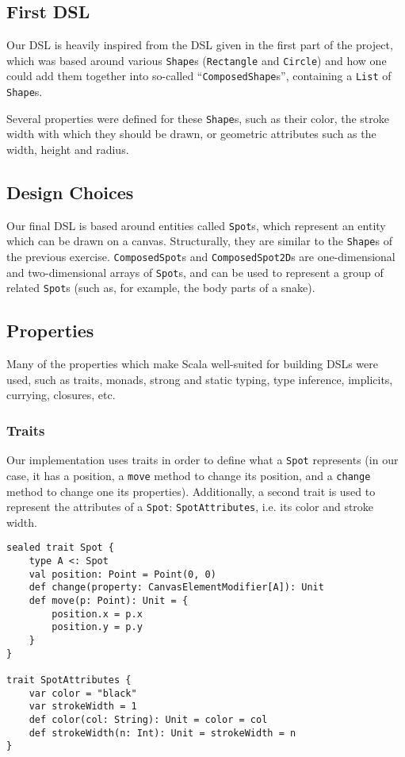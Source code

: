 \documentclass[journal,onecolumn]{IEEEtran}
\theoremstyle{definition}
\newcommand{\scala}[1]{\texttt{#1}}
\begin{document}
\subsection{First DSL}
Our DSL is heavily inspired from the DSL given in the first part of the project, which was based around various \scala{Shape}s (\scala{Rectangle} and \scala{Circle}) and how one could add them together into so-called ``\scala{ComposedShape}s'', containing a \scala{List} of \scala{Shape}s.

Several properties were defined for these \scala{Shape}s, such as their color, the stroke width with which they should be drawn, or geometric attributes such as the width, height and radius.

\subsection{Design Choices}
Our final DSL is based around entities called \scala{Spot}s, which represent an entity which can be drawn on a canvas.
Structurally, they are similar to the \scala{Shape}s of the previous exercise.
\scala{ComposedSpot}s and \scala{ComposedSpot2D}s are one-dimensional and two-dimensional arrays of \scala{Spot}s, and can be used to represent a group of related \scala{Spot}s (such as, for example, the body parts of a snake).

\subsection{Properties}
Many of the properties which make Scala well-suited for building DSLs were used, such as traits, monads, strong and static typing, type inference, implicits, currying, closures, etc.

\subsubsection{Traits}
Our implementation uses traits in order to define what a \scala{Spot} represents (in our case, it has a position, a \scala{move} method to change its position, and a \scala{change} method to change one its properties).
Additionally, a second trait is used to represent the attributes of a \scala{Spot}: \scala{SpotAttributes}, i.e. its color and stroke width.
\begin{verbatim}
sealed trait Spot {
	type A <: Spot
	val position: Point = Point(0, 0)
	def change(property: CanvasElementModifier[A]): Unit
	def move(p: Point): Unit = {
		position.x = p.x
		position.y = p.y
	}
}

trait SpotAttributes {
	var color = "black"
	var strokeWidth = 1
	def color(col: String): Unit = color = col
	def strokeWidth(n: Int): Unit = strokeWidth = n
}
\end{verbatim}
\end{document}
